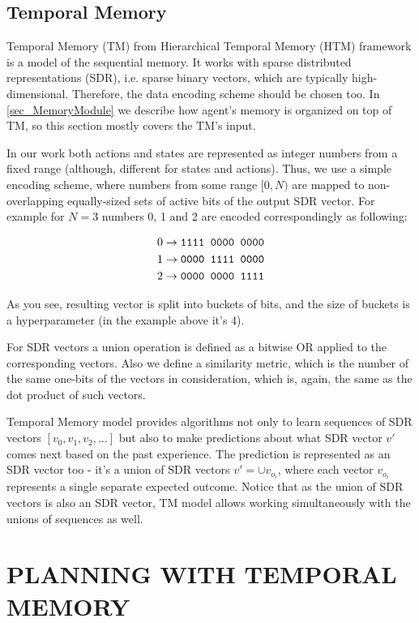 \documentclass[a4paper,twoside]{article}
\begin{document}
\subsection{Temporal Memory} \label{sec_TM}

Temporal Memory (TM) from Hierarchical Temporal Memory (HTM) framework is a model of the sequential memory. It works with sparse distributed representations (SDR), i.e. sparse binary vectors, which are typically high-dimensional. Therefore, the data encoding scheme should be chosen too. In \ref{sec_MemoryModule} we describe how agent's memory is organized on top of TM, so this section mostly covers the TM's input.

In our work both actions and states are represented as integer numbers from a fixed range (although, different for states and actions). Thus, we use a simple encoding scheme, where numbers from some range $[0, N)$ are mapped to non-overlapping equally-sized sets of active bits of the output SDR vector. For example for $N = 3$ numbers 0, 1 and 2 are encoded correspondingly as following:

$$
\begin{aligned}
  0 & \rightarrow \verb|1111 0000 0000| \\
  1 & \rightarrow \verb|0000 1111 0000| \\
  2 & \rightarrow \verb|0000 0000 1111| \\
\end{aligned}
$$

As you see, resulting vector is split into buckets of bits, and the size of buckets is a hyperparameter (in the example above it's 4).

For SDR vectors a union operation is defined as a bitwise OR applied to the corresponding vectors. Also we define a similarity metric, which is the number of the same one-bits of the vectors in consideration, which is, again, the same as the dot product of such vectors.

Temporal Memory model provides algorithms not only to learn sequences of SDR vectors $[v_0, v_1, v_2, \dots ]$ but also to make predictions about what SDR vector $v'$ comes next based on the past experience. The prediction is represented as an SDR vector too - it's a union of SDR vectors $v' = \cup v_{o_i}$, where each vector $v_{o_i}$ represents a single separate expected outcome. Notice that as the union of SDR vectors is also an SDR vector, TM model allows working simultaneously with the unions of sequences as well.

\section{\uppercase{Planning with Temporal Memory}}
\end{document}
